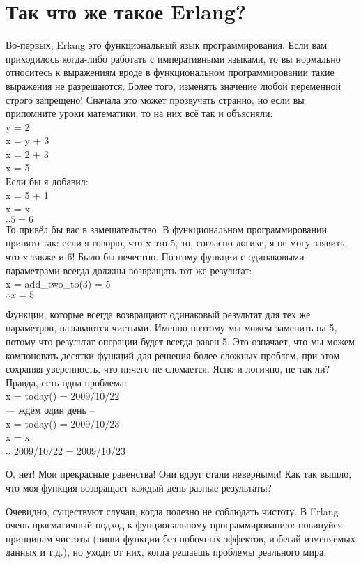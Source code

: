 \section{Так что же такое Erlang?}
Во\--первых, Erlang это функциональный язык программирования. Если вам приходилось когда\--либо работать с императивными языками, то вы нормально относитесь к выражениям вроде  в функциональном программировании такие выражения не разрешаются. Более того, изменять значение любой переменной строго запрещено! Сначала это может прозвучать странно, но если вы припомните уроки математики, то на них всё так и объясняли:\\ 
y = 2\\ 
x = y + 3\\ 
x = 2 + 3\\ 
x = 5\\ 
Если бы я добавил:\\ 
x = 5 + 1\\ 
x = x\\ 
$\therefore 5 = 6$\\ 

То привёл бы вас в замешательство. В функциональном программировании принято так: если я говорю, что x это 5, то, согласно логике, я не могу заявить, что x также и 6! Было бы нечестно. Поэтому функции с одинаковыми параметрами всегда должны возвращать тот же результат:\\  
x = add\_two\_to(3) = 5\\ 
$\therefore x = 5$
 
Функции, которые  всегда возвращают одинаковый результат для тех же параметров, называются чистыми. Именно поэтому мы можем заменить   на 5, потому что результат операции  будет всегда равен 5. Это означает, что мы можем компоновать десятки функций для решения более сложных проблем, при этом сохраняя уверенность, что ничего не сломается. Ясно и логично, не так ли? Правда, есть одна проблема:\\ 
x = today() = 2009/10/22\\ 
--- ждём один день --\\ 
x = today() = 2009/10/23\\ 
x = x\\ 
$\therefore$ 2009/10/22 = 2009/10/23 

О, нет! Мои прекрасные равенства! Они вдруг стали неверными! Как так вышло, что моя функция возвращает каждый день разные результаты?

Очевидно, существуют случаи, когда полезно не соблюдать чистоту. В Erlang очень прагматичный подход к фунциональному программированию: повинуйся принципам чистоты (пиши функции без побочных эффектов, избегай изменяемых данных и т.д.), но уходи от них, когда решаешь проблемы реального мира.

